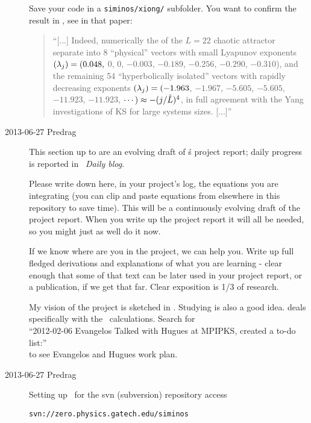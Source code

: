 \begin{description}
Save your code in a \texttt{siminos/xiong/} subfolder. You want to
confirm the result in , see
 in
that paper:

\begin{quote}
``[...] Indeed, numerically the {\cLvs} of the $L=22$ chaotic attractor separate
into 8 ``physical'' vectors with small Lyapunov exponents
$(\lambda_j) = (0.048,$ 0, 0, $-0.003$, $-0.189$, $-0.256$,
$-0.290$, $-0.310$),
and the remaining 54 ``hyperbolically isolated'' vectors with rapidly
decreasing exponents
$(\lambda_j)
= (-1.963$,   $-1.967$,   $-5.605$,   $-5.605$,  $-11.923$,  $-11.923$,
 $\cdots) \approx -(j/\tilde{L})^4$,
in full agreement with the Yang \etal{} investigations
of KS for large systems sizes.
 [...]''
\end{quote}

\item[2013-06-27 Predrag]
This section up to  are an evolving draft of
\XD\'s project report; daily progress is reported in
~{\em Daily blog}.

Please {\color{red} write down here}, in your project's
log, the equations you are integrating (you can clip and paste
equations from elsewhere in this repository to save time).
This will be a continuously evolving draft of the project report.
When you
write up the project report it will all be needed, so you might just
as well do it now.

If we know where are you in the project, we can help you.
Write up full fledged
derivations and explanations of what you are learning - clear enough
that some of that text can be later used in your project report, or a
publication, if we get that far. Clear exposition is 1/3 of research.

My vision of the project is sketched in . Studying
 is also a good idea. 
deals specifically with the \KS\ calculations.
Search for\\
``2012-02-06 Evangelos Talked with Hugues at MPIPKS, created a to-do list:''
\\
to see Evangelos and Hugues work plan.

\item[2013-06-27 Predrag]
Setting up \XD\ for the svn (subversion) repository access

\texttt{svn://zero.physics.gatech.edu/siminos}


\end{description}
